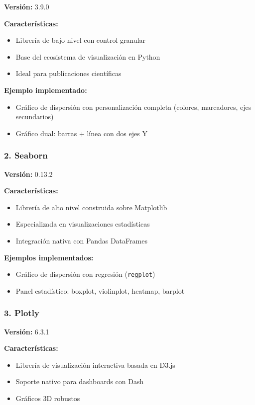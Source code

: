 \documentclass[12pt]{src/formato_utem}
\begin{document}
\textbf{Versión:} 3.9.0

\textbf{Características:}
\begin{itemize}
    \item Librería de bajo nivel con control granular
    \item Base del ecosistema de visualización en Python
    \item Ideal para publicaciones científicas
\end{itemize}

\textbf{Ejemplo implementado:}
\begin{itemize}
    \item Gráfico de dispersión con personalización completa (colores, marcadores, ejes secundarios)
    \item Gráfico dual: barras + línea con dos ejes Y
\end{itemize}

\subsubsection{2. Seaborn}

\textbf{Versión:} 0.13.2

\textbf{Características:}
\begin{itemize}
    \item Librería de alto nivel construida sobre Matplotlib
    \item Especializada en visualizaciones estadísticas
    \item Integración nativa con Pandas DataFrames
\end{itemize}

\textbf{Ejemplos implementados:}
\begin{itemize}
    \item Gráfico de dispersión con regresión (\texttt{regplot})
    \item Panel estadístico: boxplot, violinplot, heatmap, barplot
\end{itemize}

\subsubsection{3. Plotly}

\textbf{Versión:} 6.3.1

\textbf{Características:}
\begin{itemize}
    \item Librería de visualización interactiva basada en D3.js
    \item Soporte nativo para dashboards con Dash
    \item Gráficos 3D robustos
\end{itemize}
\end{document}
